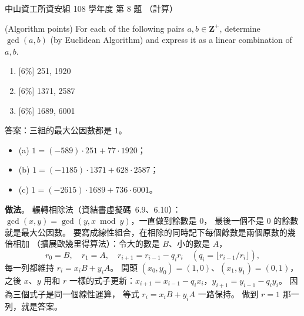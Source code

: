 \begin{pastexam}[label={px:nsysu-108-dmalg-04}]{中山資工所資安組 108 學年度 第 8 題}
（計算）

(Algorithm points) For each of the following pairs $a,b\in\mathbf{Z}^+$, determine $\gcd(a,b)$ (by
Euclidean Algorithm) and express it as a linear combination of $a,b$.
\begin{enumerate}[label=(\alph*)]
\item {[6\%]} 251, 1920
\item {[6\%]} 1371, 2587
\item {[6\%]} 1689, 6001
\end{enumerate}
\end{pastexam}

\begin{pastsoln}
答案：三組的最大公因數都是 $1$。
\begin{itemize}
\item (a) $1 = (-589) \cdot 251 + 77 \cdot 1920$；
\item (b) $1 = (-1185) \cdot 1371 + 628 \cdot 2587$；
\item (c) $1 = (-2615) \cdot 1689 + 736 \cdot 6001$。
\end{itemize}

\textbf{做法}。 輾轉相除法（資結書虛擬碼~6.9、6.10）：$\gcd(x, y) = \gcd(y, x \bmod y)$，一直做到餘數是 $0$，
最後一個不是 $0$ 的餘數就是最大公因數。 要寫成線性組合，在相除的同時記下每個餘數是兩個原數的幾倍相加
（擴展歐幾里得算法）：令大的數是 $B$、小的數是 $A$，
\[
r_0 = B,\quad r_1 = A,\quad r_{i+1} = r_{i-1} - q_i r_i \quad (q_i = \lfloor r_{i-1}/r_i \rfloor),
\]
每一列都維持 $r_i = x_i B + y_i A$。 開頭 $(x_0, y_0) = (1, 0)$、$(x_1, y_1) = (0, 1)$，之後 $x$、$y$ 用和 $r$
一樣的式子更新：$x_{i+1} = x_{i-1} - q_i x_i$，$y_{i+1} = y_{i-1} - q_i y_i$。 因為三個式子是同一個線性運算，
等式 $r_i = x_i B + y_i A$ 一路保持。 做到 $r = 1$ 那一列，就是答案。


\end{pastsoln}
